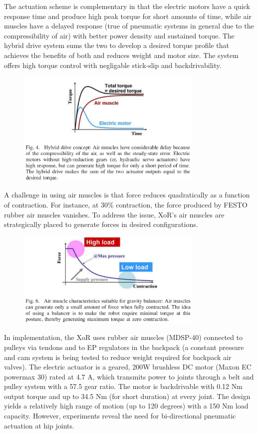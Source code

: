 \begin{refsection}
The actuation scheme is complementary in that the electric motors have a quick response time and produce high peak torque for short amounts of time, while air muscles have a delayed response (true of pneumatic systems in general due to the compressibility of air) with better power density and sustained torque.  The hybrid drive system sums the two to develop a desired torque profile that achieves the benefits of both and reduces weight and motor size.  The system offers high torque control with negligable stick-slip and backdrivability.

\begin{figure}[ht]
  \centering
  \includegraphics[width=3.5in]{exos/figs/xor_hybrid_drive_torque_time.png}
\end{figure}  

A challenge in using air muscles is that force reduces quadratically as a function of contraction.  For instance, at 30\% contraction, the force produced by FESTO rubber air muscles vanishes.  To address the issue, XoR's air muscles are strategically placed to generate forces in desired configurations.  

\begin{figure}[ht]
  \centering
  \includegraphics[width=3.5in]{exos/figs/xor_air_muscle_force_vs_contraction.png}
\end{figure}

In implementation, the XoR uses rubber air muscles (MDSP-40) connected to pulleys via tendons and to EP regulators in the backpack (a constant pressure and cam system is being tested to reduce weight required for backpack air valves).  The electric actuator is a geared, 200W brushless DC motor (Maxon EC powermax 30) rated at 4.7 A, which transmits power to joints through a belt and pulley system with a 57.5 gear ratio. The motor is backdrivable with 0.12 Nm output torque and up to 34.5 Nm (for short duration) at every joint.  The design yields a relatively high range of motion (up to 120 degrees) with a 150 Nm load capacity.  However, experiments reveal the need for bi-directional pneumatic actuation at hip joints.


\end{refsection}
